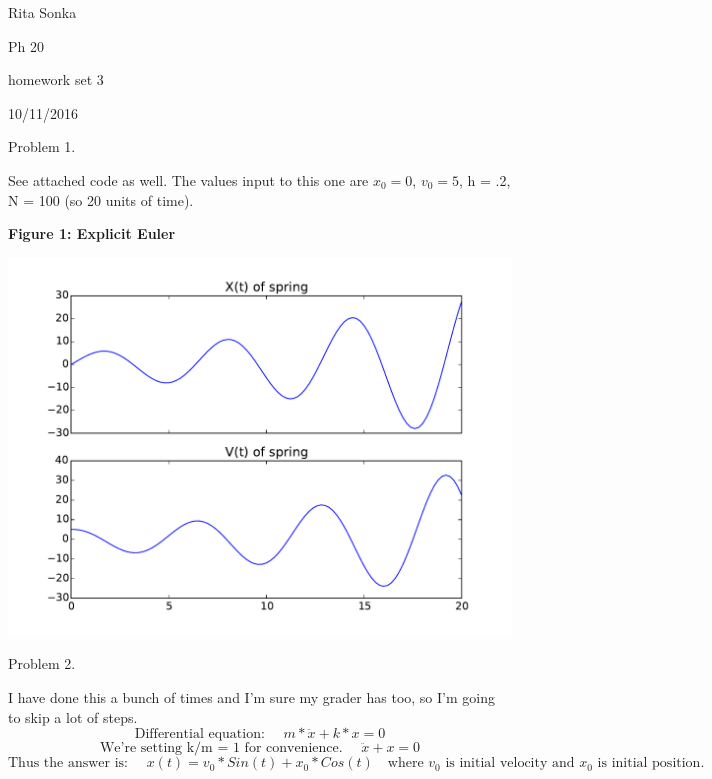 \documentclass{article}
\begin{document}
Rita Sonka

Ph 20

homework set 3

10/11/2016

\bigskip

Problem 1.

See attached code as well. The values input to this one are $x_{0} = 0$, $v_{0} = 5$, h = .2, N = 100 (so 20 units of time).
\begin{center}
    \textbf{Figure 1: Explicit Euler}\par\medskip
    \includegraphics[scale=1.0]{explicitEuler1}
\end{center}


Problem 2. 

I have done this a bunch of times and I'm sure my grader has too, so I'm going to skip a lot of steps.
\begin{equation}
   \textrm{Differential equation: } \quad  m * \ddot{x} + k * x = 0 
\end{equation}
\begin{equation}
   \textrm{We're setting k/m = 1 for convenience. } \quad \ddot{x} + x = 0 
\end{equation}
\begin{equation}
   \textrm{Thus the answer is: } \quad  x(t) = v_{0}*Sin(t) + x_{0}*Cos(t) \quad \textrm{where $v_{0}$ is initial velocity and $x_{0}$ is initial position. }
\end{equation}

\clearpage
\end{document}
